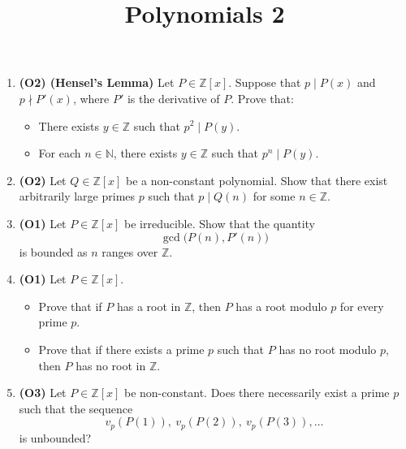 \documentclass[11pt]{article}
\title{Polynomials 2}
\date{}
\begin{document}
	
	\maketitle
	
	\begin{enumerate}
		
		\item \textbf{(O2) (Hensel's Lemma)}  
		Let $P \in \mathbb{Z}[x]$. Suppose that $p \mid P(x)$ and $p \nmid P'(x)$, where $P'$ is the derivative of $P$. Prove that:
		\begin{itemize}
			\item[(a)] There exists $y \in \mathbb{Z}$ such that $p^2 \mid P(y)$.
			\item[(b)] For each $n \in \mathbb{N}$, there exists $y \in \mathbb{Z}$ such that $p^n \mid P(y)$.
		\end{itemize}
		
		\item \textbf{(O2)}  
		Let $Q \in \mathbb{Z}[x]$ be a non-constant polynomial. Show that there exist arbitrarily large primes $p$ such that $p \mid Q(n)$ for some $n \in \mathbb{Z}$.
		
		\item \textbf{(O1)}  
		Let $P \in \mathbb{Z}[x]$ be irreducible. Show that the quantity
		\[
		\gcd\big(P(n), P'(n)\big)
		\]
		is bounded as $n$ ranges over $\mathbb{Z}$.
		
		\item \textbf{(O1)}  
		Let $P \in \mathbb{Z}[x]$.
		\begin{itemize}
			\item[(a)] Prove that if $P$ has a root in $\mathbb{Z}$, then $P$ has a root modulo $p$ for every prime $p$.
			\item[(b)] Prove that if there exists a prime $p$ such that $P$ has no root modulo $p$, then $P$ has no root in $\mathbb{Z}$.
		\end{itemize}
		
		\item \textbf{(O3)}  
		Let $P \in \mathbb{Z}[x]$ be non-constant. Does there necessarily exist a prime $p$ such that the sequence
		\[
		v_p(P(1)),\ v_p(P(2)),\ v_p(P(3)),\dots
		\]
		is unbounded?
		
	\end{enumerate}
	
\end{document}

